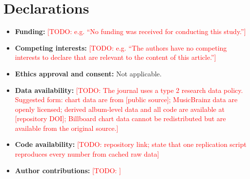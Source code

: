 \documentclass[pdflatex,sn-apa]{sn-jnl}
\newcommand{\todo}[1]{\textcolor{red}{[TODO: #1]}}
\begin{document}
\section*{Declarations}
\begin{itemize}
  \item \textbf{Funding:} \todo{e.g. ``No funding was received for conducting this study.''}
  \item \textbf{Competing interests:} \todo{e.g. ``The authors have no competing interests to declare that are relevant to the content of this article.''}
  \item \textbf{Ethics approval and consent:} Not applicable.
  \item \textbf{Data availability:} \todo{The journal uses a type 2 research data policy. Suggested form: chart data are from [public source]; MusicBrainz data are openly licensed; derived album-level data and all code are available at [repository DOI]; Billboard chart data cannot be redistributed but are available from the original source.}
  \item \textbf{Code availability:} \todo{repository link; state that one replication script reproduces every number from cached raw data}
  \item \textbf{Author contributions:} \todo{}
\end{itemize}


\end{document}
